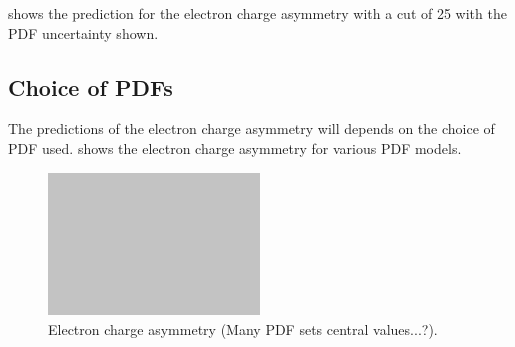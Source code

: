  shows the prediction for the electron charge
asymmetry with a \PT cut of \unit{25}{\GeV} with the \ac{PDF} uncertainty shown.




\subsection{Choice of \acp{PDF}}

The predictions of the electron charge asymmetry will depends on the choice of
\ac{PDF} used. 
 shows the electron charge asymmetry for
various \ac{PDF} models.

\begin{figure}[htb]
  \centering
  \includegraphics[width=0.5\textwidth]{placeholder}
  \caption{Electron charge asymmetry (Many PDF sets central values...?).}
  \label{wbos:asym_pdf}
\end{figure}








